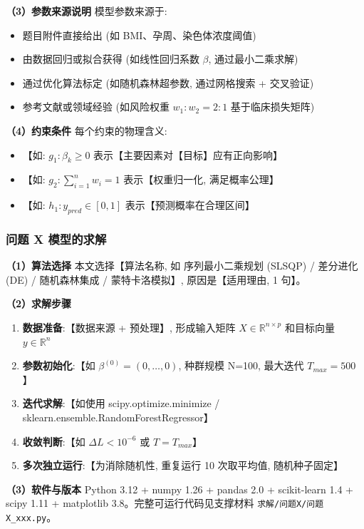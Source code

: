 \textbf{（3）参数来源说明} \quad 模型参数来源于:
\begin{itemize}
  \item 题目附件直接给出 (如 BMI、孕周、染色体浓度阈值)
  \item 由数据回归或拟合获得 (如线性回归系数 $\beta$, 通过最小二乘求解)
  \item 通过优化算法标定 (如随机森林超参数, 通过网格搜索 + 交叉验证)
  \item 参考文献或领域经验 (如风险权重 $w_1:w_2 = 2:1$ 基于临床损失矩阵)
\end{itemize}

\textbf{（4）约束条件} \quad 每个约束的物理含义:
\begin{itemize}
  \item 【如: $g_1: \beta_k \geq 0$ 表示【主要因素对【目标】应有正向影响】
  \item 【如: $g_2: \sum_{i=1}^{n} w_i = 1$ 表示【权重归一化, 满足概率公理】
  \item 【如: $h_1: y_{pred} \in [0,1]$ 表示【预测概率在合理区间】
\end{itemize}

\subsubsection{问题 X 模型的求解}

\textbf{（1）算法选择} \quad 本文选择【算法名称, 如 序列最小二乘规划 (SLSQP) / 差分进化 (DE) / 随机森林集成 / 蒙特卡洛模拟】, 原因是【适用理由, 1 句】。

\textbf{（2）求解步骤}
\begin{enumerate}
  \item \textbf{数据准备}:【数据来源 + 预处理】, 形成输入矩阵 $X \in \mathbb{R}^{n \times p}$ 和目标向量 $y \in \mathbb{R}^n$
  \item \textbf{参数初始化}:【如 $\beta^{(0)} = (0,\ldots,0)$, 种群规模 N=100, 最大迭代 $T_{max}=500$】
  \item \textbf{迭代求解}:【如使用 scipy.optimize.minimize / sklearn.ensemble.RandomForestRegressor】
  \item \textbf{收敛判断}:【如 $\Delta L < 10^{-6}$ 或 $T = T_{max}$】
  \item \textbf{多次独立运行}:【为消除随机性, 重复运行 10 次取平均值, 随机种子固定】
\end{enumerate}

\textbf{（3）软件与版本} \quad Python 3.12 + numpy 1.26 + pandas 2.0 + scikit-learn 1.4 + scipy 1.11 + matplotlib 3.8。完整可运行代码见支撑材料 \texttt{求解/问题X/问题X\_xxx.py}。

